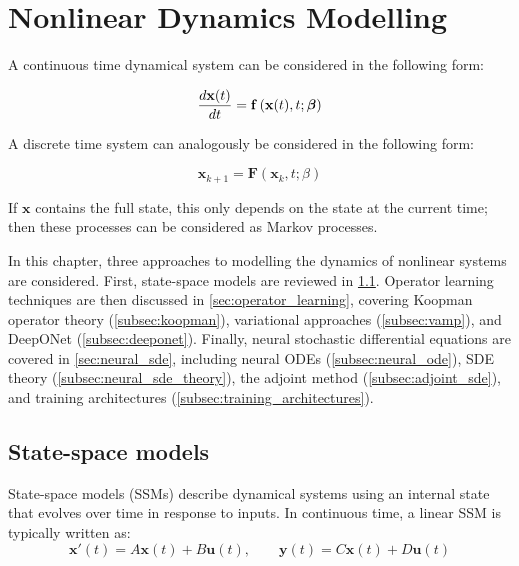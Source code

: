\chapter{Nonlinear Dynamics Modelling}
\label{chapter:dynamic_modelling}
A continuous time dynamical system can be considered in the following form:

\begin{equation}
    \label{eq:continuous_dynamical_system}
    \frac{d \mathbf{x}(t)}{d t} = \mathbf{f}\left(\mathbf{x}(t), t; \boldsymbol{\beta}\right)
\end{equation}

A discrete time system can analogously be considered in the following form:

\begin{equation}
    \mathbf{x}_{k + 1} = \mathbf{F}(\mathbf{x}_k, t; \mathbb{\beta})
    \label{eq:discrete_dynamical_system}
\end{equation}

If \(\mathbf{x}\) contains the full state, this only depends on the state at the current time; then these processes can be considered as Markov processes.

In this chapter, three approaches to modelling the dynamics of nonlinear systems are considered. First, state-space
models are reviewed in \cref{sec:state_space_models}. Operator learning techniques are then discussed in
\cref{sec:operator_learning}, covering Koopman operator theory (\cref{subsec:koopman}), variational approaches
(\cref{subsec:vamp}), and DeepONet (\cref{subsec:deeponet}). Finally, neural stochastic differential equations are
covered in \cref{sec:neural_sde}, including neural ODEs (\cref{subsec:neural_ode}), SDE theory
(\cref{subsec:neural_sde_theory}), the adjoint method (\cref{subsec:adjoint_sde}), and training architectures
(\cref{subsec:training_architectures}). 

\section{State-space models}
\label{sec:state_space_models}
State-space models (SSMs) describe dynamical systems using an internal state that evolves over time in response to inputs. In continuous time, a linear SSM is typically written as:
\begin{equation}
    \label{eq:ssm_continuous}
    \mathbf{x}'(t) = A\mathbf{x}(t) + B\mathbf{u}(t), \qquad \mathbf{y}(t) = C\mathbf{x}(t) + D\mathbf{u}(t)
\end{equation}

